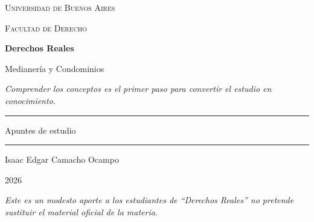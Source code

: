 \documentclass[12pt,oneside]{book}
\newcommand{\universidad}{Universidad de Buenos Aires}
\newcommand{\facultad}{Facultad de Derecho}
\newcommand{\materia}{Derechos Reales}
\newcommand{\titulo}{Medianería y Condominios}
\newcommand{\autor}{Isaac Edgar Camacho Ocampo}
\newcommand{\anio}{2026}
\begin{document}
\begin{titlepage}

\thispagestyle{empty}

\begin{center}

\vspace*{1cm}

{\large \textsc{\universidad}}

\vspace{0.2cm}

{\large \textsc{\facultad}}

\vspace{3cm}

{\Huge \textbf{\materia}}

\vspace{1cm}

{\LARGE \titulo}

\vspace{0.8cm}

\textit{Comprender los conceptos es el primer paso para convertir el estudio en conocimiento.}

\vspace{1.2cm}

\rule{0.70\textwidth}{0.5pt}

\vspace{0.5cm}

{\large Apuntes de estudio}

\vspace{0.5cm}

\rule{0.70\textwidth}{0.5pt}

\vfill

{\large \autor}

\vspace{0.3cm}

{\large \anio}

\end{center}

\vfill

\begin{flushleft}
\textit{Este es un modesto aporte a los estudiantes de ``Derechos Reales'' no pretende sustituir el material oficial de la materia.}
\end{flushleft}

\end{titlepage}

\tableofcontents
\end{document}
